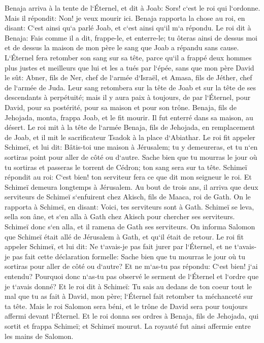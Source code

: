\verse Benaja arriva à la tente de l`Éternel, et dit à Joab: Sors! c`est le roi qui l`ordonne. Mais il répondit: Non! je veux mourir ici. Benaja rapporta la chose au roi, en disant: C`est ainsi qu`a parlé Joab, et c`est ainsi qu`il m`a répondu. 
\verse Le roi dit à Benaja: Fais comme il a dit, frappe-le, et enterre-le; tu ôteras ainsi de dessus moi et de dessus la maison de mon père le sang que Joab a répandu sans cause. 
\verse L`Éternel fera retomber son sang sur sa tête, parce qu`il a frappé deux hommes plus justes et meilleurs que lui et les a tués par l`épée, sans que mon père David le sût: Abner, fils de Ner, chef de l`armée d`Israël, et Amasa, fils de Jéther, chef de l`armée de Juda. 
\verse Leur sang retombera sur la tête de Joab et sur la tête de ses descendants à perpétuité; mais il y aura paix à toujours, de par l`Éternel, pour David, pour sa postérité, pour sa maison et pour son trône. 
\verse Benaja, fils de Jehojada, monta, frappa Joab, et le fit mourir. Il fut enterré dans sa maison, au désert. 
\verse Le roi mit à la tête de l`armée Benaja, fils de Jehojada, en remplacement de Joab, et il mit le sacrificateur Tsadok à la place d`Abiathar. 
\verse Le roi fit appeler Schimeï, et lui dit: Bâtis-toi une maison à Jérusalem; tu y demeureras, et tu n`en sortiras point pour aller de côté ou d`autre. 
\verse Sache bien que tu mourras le jour où tu sortiras et passeras le torrent de Cédron; ton sang sera sur ta tête. 
\verse Schimeï répondit au roi: C`est bien! ton serviteur fera ce que dit mon seigneur le roi. Et Schimeï demeura longtemps à Jérusalem. 
\verse Au bout de trois ans, il arriva que deux serviteurs de Schimeï s`enfuirent chez Akisch, fils de Maaca, roi de Gath. On le rapporta à Schimeï, en disant: Voici, tes serviteurs sont à Gath. 
\verse Schimeï se leva, sella son âne, et s`en alla à Gath chez Akisch pour chercher ses serviteurs. Schimeï donc s`en alla, et il ramena de Gath ses serviteurs. 
\verse On informa Salomon que Schimeï était allé de Jérusalem à Gath, et qu`il était de retour. 
\verse Le roi fit appeler Schimeï, et lui dit: Ne t`avais-je pas fait jurer par l`Éternel, et ne t`avais-je pas fait cette déclaration formelle: Sache bien que tu mourras le jour où tu sortiras pour aller de côté ou d`autre? Et ne m`as-tu pas répondu: C`est bien! j`ai entendu? 
\verse Pourquoi donc n`as-tu pas observé le serment de l`Éternel et l`ordre que je t`avais donné? 
\verse Et le roi dit à Schimeï: Tu sais au dedans de ton coeur tout le mal que tu as fait à David, mon père; l`Éternel fait retomber ta méchanceté sur ta tête. 
\verse Mais le roi Salomon sera béni, et le trône de David sera pour toujours affermi devant l`Éternel. 
\verse Et le roi donna ses ordres à Benaja, fils de Jehojada, qui sortit et frappa Schimeï; et Schimeï mourut. La royauté fut ainsi affermie entre les mains de Salomon. 

